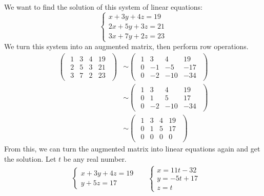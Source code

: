 \documentclass{huhtakm-template-book}
\begin{document}
\begin{eg}
    We want to find the solution of this system of linear equations:
    \begin{equation*}
        \begin{cases}
            x+3y+4z=19\\
            2x+5y+3z=21\\
            3x+7y+2z=23
        \end{cases}
    \end{equation*}
    We turn this system into an augmented matrix, then perform row operations.
    \begin{align*}
        \begin{pmatrix}
            \begin{array}{ccc|c}
                1 & 3 & 4 & 19\\
                2 & 5 & 3 & 21\\
                3 & 7 & 2 & 23
            \end{array}
        \end{pmatrix}&\sim\begin{pmatrix}
            \begin{array}{ccc|c}
                1 & 3 & 4 & 19\\
                0 & -1 & -5 & -17\\
                0 & -2 & -10 & -34
            \end{array}
        \end{pmatrix}\\
        &\sim\begin{pmatrix}
            \begin{array}{ccc|c}
                1 & 3 & 4 & 19\\
                0 & 1 & 5 & 17\\
                0 & -2 & -10 & -34
            \end{array}
        \end{pmatrix}\\
        &\sim\begin{pmatrix}
            \begin{array}{ccc|c}
                1 & 3 & 4 & 19\\
                0 & 1 & 5 & 17\\
                0 & 0 & 0 & 0
            \end{array}
        \end{pmatrix}
    \end{align*}
    From this, we can turn the augmented matrix into linear equations again and get the solution. Let $t$ be any real number.
    \begin{align*}
        &\begin{cases}
            x+3y+4z=19\\
            y+5z=17
        \end{cases} & &\begin{cases}
            x=11t-32\\
            y=-5t+17\\
            z=t
        \end{cases}
    \end{align*}
\end{eg}
\end{document}
